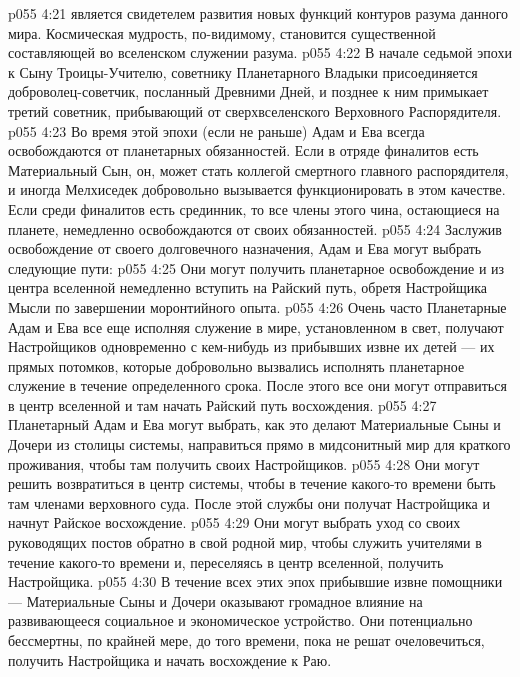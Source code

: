 \vs p055 4:21 \pc {}\bibnobreakspace {} является свидетелем развития новых функций контуров разума данного мира. Космическая мудрость, по\hyp{}видимому, становится существенной составляющей во вселенском служении разума.
\vs p055 4:22 \pc {}\bibnobreakspace {} В начале седьмой эпохи к Сыну Троицы\hyp{}Учителю, советнику Планетарного Владыки присоединяется доброволец\hyp{}советчик, посланный Древними Дней, и позднее к ним примыкает третий советник, прибывающий от сверхвселенского Верховного Распорядителя.
\vs p055 4:23 Во время этой эпохи (если не раньше) Адам и Ева всегда освобождаются от планетарных обязанностей. Если в отряде финалитов есть Материальный Сын, он, может стать коллегой смертного главного распорядителя, и иногда Мелхиседек добровольно вызывается функционировать в этом качестве. Если среди финалитов есть срединник, то все члены этого чина, остающиеся на планете, немедленно освобождаются от своих обязанностей.
\vs p055 4:24 \pc Заслужив освобождение от своего долговечного назначения, Адам и Ева могут выбрать следующие пути:
\vs p055 4:25 \bibnobreakspace Они могут получить планетарное освобождение и из центра вселенной немедленно вступить на Райский путь, обретя Настройщика Мысли по завершении моронтийного опыта.
\vs p055 4:26 \pc {}\bibnobreakspace Очень часто Планетарные Адам и Ева все еще исполняя служение в мире, установленном в свет, получают Настройщиков одновременно с кем\hyp{}нибудь из прибывших извне их детей --- их прямых потомков, которые добровольно вызвались исполнять планетарное служение в течение определенного срока. После этого все они могут отправиться в центр вселенной и там начать Райский путь восхождения.
\vs p055 4:27 \pc {}\bibnobreakspace Планетарный Адам и Ева могут выбрать, как это делают Материальные Сыны и Дочери из столицы системы, направиться прямо в мидсонитный мир для краткого проживания, чтобы там получить своих Настройщиков.
\vs p055 4:28 \pc {}\bibnobreakspace Они могут решить возвратиться в центр системы, чтобы в течение какого\hyp{}то времени быть там членами верховного суда. После этой службы они получат Настройщика и начнут Райское восхождение.
\vs p055 4:29 \pc {}\bibnobreakspace Они могут выбрать уход со своих руководящих постов обратно в свой родной мир, чтобы служить учителями в течение какого\hyp{}то времени и, переселяясь в центр вселенной, получить Настройщика.
\vs p055 4:30 \pc В течение всех этих эпох прибывшие извне помощники --- Материальные Сыны и Дочери оказывают громадное влияние на развивающееся социальное и экономическое устройство. Они потенциально бессмертны, по крайней мере, до того времени, пока не решат очеловечиться, получить Настройщика и начать восхождение к Раю.
